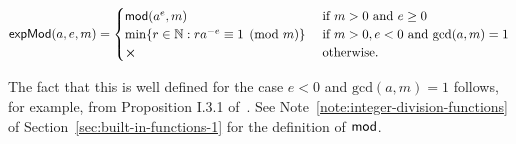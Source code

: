 $$
\mathsf{expMod}(a,e,m) =
  \begin{cases}
     \modfn(a^e,m) & \text{if $m > 0$ and $e \geq 0$}\\
     \min\{r \in \N: ra^{-e} \equiv 1\pmod{m}\}\  & \text{if $m > 0, e < 0$ and $\mathrm{gcd}(a,m) = 1$}\\
     \errorX & \text{otherwise.}
  \end{cases}
$$ 

\noindent The fact that this is well defined for the case $e<0$ and $\mathrm{gcd}(a,m) = 1$
follows, for example, from Proposition I.3.1 of~\cite{Koblitz-GTM}.  See
Note~\ref{note:integer-division-functions} of
Section~\ref{sec:built-in-functions-1} for the definition of $\operatorname{\mathsf{mod}}$.

